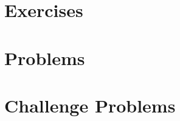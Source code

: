 \discussion{

}

\discussion{

}

\discussion{

}

\discussion{

}

\discussion{

}

\discussion{

}

\discussion{

}

\discussion{

}

\discussion{

}

\discussion{

}

\discussion{

}

\discussion{

}

\discussion{

}

\discussion{

}

\section{Exercises}

\section{Problems}

\section{Challenge Problems}
